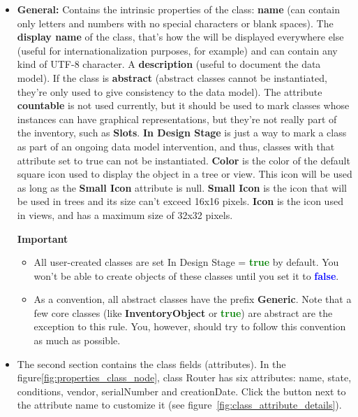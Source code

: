 \documentclass[a4paper]{article}
\begin{document}
			\begin{itemize}
				\item \textbf{General:} Contains the intrinsic properties  of  the class: \textbf{name} (can contain only letters and numbers with no special characters  or  blank  spaces). The  \textbf{display name} of the class, that's how the  will be displayed everywhere else (useful  for  internationalization  purposes, for example) and can contain any kind of UTF-8 character. A \textbf{description} (useful  to  document  the  data  model). If  the class is \textbf{abstract} (abstract classes  cannot  be  instantiated, they're only used to give consistency to the  data  model). The attribute \textbf{countable} is not used currently, but it should be used to mark classes whose instances can have graphical representations, but  they're  not really  part  of  the  inventory,  such  as  \textbf{Slots}. \textbf{In Design Stage} is just a way to mark a class as part of an ongoing data model intervention, and thus, classes with that attribute set to true can not be instantiated. \textbf{Color} is the color of the default square icon used to display the object in a tree or view. This icon will be used as long as the \textbf{Small Icon} attribute is null. \textbf{Small Icon} is the icon that will be used in trees and its size can't exceed 16x16 pixels. \textbf{Icon} is the icon used in views, and has a maximum size of 32x32 pixels.
				\begin{framed} {\large \textbf{Important}}
					\begin{itemize}
						\item All user-created classes are set In Design Stage = \textbf{\textcolor{green}{true}} by default. You won't be able to create objects of these classes until you set it to \textbf{\textcolor{blue}{false}}.
						\item As a convention, all abstract classes have the prefix \textbf{Generic}. Note that a few core classes (like \textbf{InventoryObject} or \textbf{\textcolor{green}{true}}) are abstract are the exception to this rule. You, however, should try to follow this convention as much as possible.
					\end{itemize}
				\end{framed}
				\item The second section  contains the class fields (attributes). In the  figure\ref{fig:properties_class_node}, class Router  has six attributes: name, state, conditions, vendor, serialNumber and creationDate. Click the button next to the attribute name to customize it (see figure~\ref{fig:class_attribute_details}).

\end{itemize}
\end{document}

